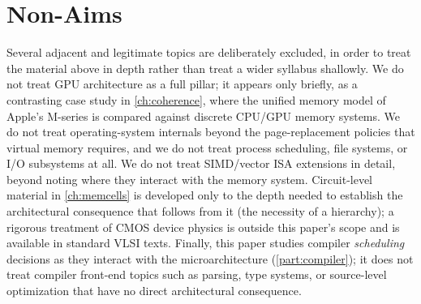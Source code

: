 \documentclass[11pt,a4paper]{report}
\begin{document}
\section{Non-Aims}
\label{sec:non-aims}

Several adjacent and legitimate topics are deliberately excluded, in
order to treat the material above in depth rather than treat a wider
syllabus shallowly. We do not treat GPU architecture as a full pillar;
it appears only briefly, as a contrasting case study in
\cref{ch:coherence}, where the unified memory model of Apple's M-series
is compared against discrete CPU/GPU memory systems. We do not treat
operating-system internals beyond the page-replacement policies that
virtual memory requires, and we do not treat process scheduling,
file systems, or I/O subsystems at all. We do not treat SIMD/vector
ISA extensions in detail, beyond noting where they interact with the
memory system. Circuit-level material in \cref{ch:memcells} is developed
only to the depth needed to establish the architectural consequence that
follows from it (the necessity of a hierarchy); a rigorous treatment of
CMOS device physics is outside this paper's scope and is available in
standard VLSI texts. Finally, this paper studies compiler
\emph{scheduling} decisions as they interact with the microarchitecture
(\cref{part:compiler}); it does not treat compiler front-end topics such
as parsing, type systems, or source-level optimization that have no
direct architectural consequence.
\end{document}
